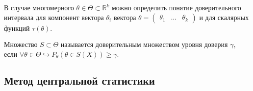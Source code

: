 В случае многомерного $\displaystyle \theta \in \Theta \subset \mathbb{R}^{k}$ можно определить понятие доверительного интервала для компонент вектора $\displaystyle \theta _{i}$ вектора $\displaystyle \theta =\begin{pmatrix}
\theta _{1} & \dotsc  & \theta _{k}
\end{pmatrix}$ и для скалярных функций $\displaystyle \tau ( \theta )$.
\begin{definition}
    Множество $\displaystyle S\subset \Theta $ называется доверительным множеством уровня доверия $\displaystyle \gamma $, если $\displaystyle \forall \theta \in \Theta \hookrightarrow P_{\theta }( \theta \in S( X)) \geqslant \gamma $.
\end{definition}
\subsection{Метод центральной статистики}


